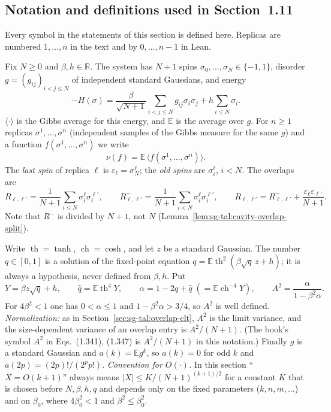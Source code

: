 \subsection{Notation and definitions used in Section~1.11}\label{sec:sg-tal:hanen-notation}

Every symbol in the statements of this section is defined here. Replicas are numbered
$1,\dots,n$ in the text and by $0,\dots,n-1$ in Lean.

\begin{definition}\label{def:sg-tal:hanen-system}
\leanok
{}
Fix $N\ge 0$ and $\beta,h\in\mathbb R$. The system has $N+1$ spins $\sigma_0,\dots,\sigma_N\in\{-1,1\}$,
disorder $g=(g_{ij})_{i<j\le N}$ of independent standard Gaussians, and energy
\[
-H(\sigma)=\frac{\beta}{\sqrt{N+1}}\sum_{i<j\le N} g_{ij}\sigma_i\sigma_j+h\sum_{i\le N}\sigma_i .
\]
$\langle\cdot\rangle$ is the Gibbs average for this energy, and $\mathbb E$ is the average over $g$.
For $n\ge1$ replicas $\sigma^1,\dots,\sigma^n$ (independent samples of the Gibbs measure for the same $g$) and a function
$f(\sigma^1,\dots,\sigma^n)$ we write
\[
\nu(f)=\mathbb E\,\langle f(\sigma^1,\dots,\sigma^n)\rangle .
\]
The \emph{last spin} of replica $\ell$ is $\varepsilon_\ell=\sigma^\ell_N$; the \emph{old spins} are $\sigma^\ell_i$, $i<N$.
The overlaps are
\[
R_{\ell,\ell'}=\frac1{N+1}\sum_{i\le N}\sigma^\ell_i\sigma^{\ell'}_i,\qquad
R^-_{\ell,\ell'}=\frac1{N+1}\sum_{i<N}\sigma^\ell_i\sigma^{\ell'}_i,\qquad
R_{\ell,\ell'}=R^-_{\ell,\ell'}+\frac{\varepsilon_\ell\varepsilon_{\ell'}}{N+1}.
\]
Note that $R^-$ is divided by $N+1$, not $N$ (Lemma~\ref{lem:sg-tal:cavity-overlap-split}).
\end{definition}

\begin{definition}\label{def:sg-tal:hanen-constants}
Write $\operatorname{th}=\tanh$, $\operatorname{ch}=\cosh$, and let $z$ be a standard Gaussian.
The number $q\in[0,1]$ is a solution of the fixed-point equation
$q=\mathbb E\operatorname{th}^2(\beta\sqrt q\,z+h)$; it is always a hypothesis, never defined from $\beta,h$.
Put
\[
Y=\beta z\sqrt q+h,\qquad \hat q=\mathbb E\operatorname{th}^4 Y,\qquad
\alpha=1-2q+\hat q\;(=\mathbb E\operatorname{ch}^{-4}Y),\qquad
A^2=\frac{\alpha}{1-\beta^2\alpha}.
\]
For $4\beta^2<1$ one has $0<\alpha\le1$ and $1-\beta^2\alpha>3/4$, so $A^2$ is well defined.
\emph{Normalization:} as in Section~\ref{sec:sg-tal:overlap-clt}, $A^2$ is the limit variance, and the size-dependent
variance of an overlap entry is $A^2/(N+1)$. (The book's symbol $A^2$ in Eqs.~(1.341), (1.347) is $A^2/(N+1)$ in this notation.)
Finally $g$ is a standard Gaussian and $a(k)=\mathbb E g^k$, so $a(k)=0$ for odd $k$ and $a(2p)=(2p)!/(2^pp!)$.
\emph{Convention for $O(\cdot)$.} In this section ``$X=O(k+1)$'' always means
$|X|\le K/(N+1)^{(k+1)/2}$ for a constant $K$ that is chosen before $N,\beta,h,q$ and depends only on the
fixed parameters ($k,n,m,\ldots$) and on $\beta_0$, where $4\beta_0^2<1$ and $\beta^2\le\beta_0^2$.
\end{definition}

